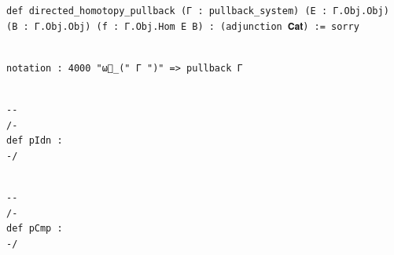 \documentclass{book}
\theoremstyle{definition}
\newcounter{lcounter}
\begin{document}
{{\begin{center}
\begin{tcolorbox}[width=5in,colback={white},title={\begin{center}\texttt{Lean \thelcounter} \addtocounter{lcounter}{1}  \end{center}},colbacktitle=Blue,coltitle=black]
\begin{verbatim}
def directed_homotopy_pullback (Γ : pullback_system) (E : Γ.Obj.Obj) (B : Γ.Obj.Obj) (f : Γ.Obj.Hom E B) : (adjunction 𝐂𝐚𝐭) := sorry

\end{verbatim}
\end{tcolorbox}
\end{center}

\begin{center}
\begin{tcolorbox}[width=5in,colback={white},title={\begin{center}\texttt{Lean \thelcounter} \addtocounter{lcounter}{1}  \end{center}},colbacktitle=Blue,coltitle=black]
\begin{verbatim}

notation : 4000 "ω⃗_(" Γ ")" => pullback Γ

\end{verbatim}
\end{tcolorbox}
\end{center}

\begin{center}
\begin{tcolorbox}[width=5in,colback={white},title={\begin{center}\texttt{Lean \thelcounter} \addtocounter{lcounter}{1}  \end{center}},colbacktitle=Blue,coltitle=black]
\begin{verbatim}

-- 
/-
def pIdn : 
-/

\end{verbatim}
\end{tcolorbox}
\end{center}

\begin{center}
\begin{tcolorbox}[width=5in,colback={white},title={\begin{center}\texttt{Lean \thelcounter} \addtocounter{lcounter}{1}  \end{center}},colbacktitle=Blue,coltitle=black]
\begin{verbatim}

--
/-
def pCmp : 
-/

\end{verbatim}
\end{tcolorbox}
\end{center}

}}
\end{document}
